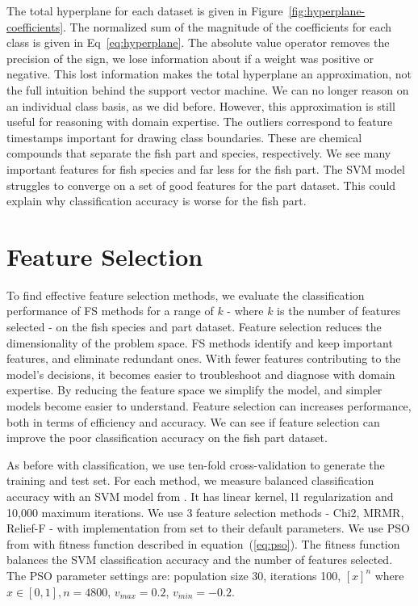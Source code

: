 \documentclass[runningheads]{llncs}
\begin{document}
The total hyperplane for each dataset is given in Figure~\ref{fig:hyperplane-coefficients}.
The normalized sum of the magnitude of the coefficients for each class is given in Eq~\ref{eq:hyperplane}.
The absolute value operator removes the precision of the sign, we lose information about if a weight was positive or negative. 
This lost information makes the total hyperplane an approximation, not the full intuition behind the support vector machine. 
We can no longer reason on an individual class basis, as we did before. 
However, this approximation is still useful for reasoning with domain expertise. 
The outliers correspond to feature timestamps important for drawing class boundaries. 
These are chemical compounds that separate the fish part and species, respectively. 
We see many important features for fish species and far less for the fish part. 
The SVM model struggles to converge on a set of good features for the part dataset. 
This could explain why classification accuracy is worse for the fish part. 

\section{Feature Selection}

To find effective feature selection methods, we evaluate the classification performance of FS methods for a range of $k$ - where $k$ is the number of features selected - on the fish species and part dataset. Feature selection reduces the dimensionality of the problem space. FS methods identify and keep important features, and eliminate redundant ones. With fewer features contributing to the model's decisions, it becomes easier to troubleshoot and diagnose with domain expertise. By reducing the feature space we simplify the model, and simpler models become easier to understand. Feature selection can increases performance, both in terms of efficiency and accuracy. We can see if feature selection can improve the poor classification accuracy on the fish part dataset. 

As before with classification, we use ten-fold cross-validation to generate the training and test set. 
For each method, we measure balanced classification accuracy with an SVM model from \cite{sklearn2021feature}.
It has linear kernel, l1 regularization \cite{robnik2003theoretical} and 10,000 maximum iterations.
We use 3 feature selection methods \cite{liu1995chi2,ding2005minimum,kononenko1994estimating} - Chi2, MRMR, Relief-F - with implementation from \cite{li2018feature} set to their default parameters.
We use PSO from \cite{kennedy1995particle} with fitness function described in equation~(\ref{eq:pso}).
The fitness function balances the SVM classification accuracy and the number of features selected.
The PSO parameter settings are: population size 30, iterations 100, $[x]^n$ where $x \in [0,1], n = 4800$, $v_{max} = 0.2$, ${v_{min} = -0.2}$.
\end{document}
